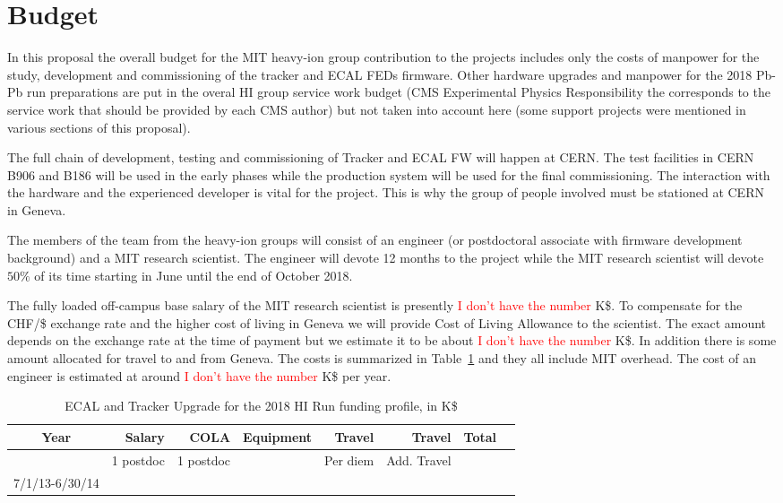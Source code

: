 \section{Budget}
\label{sec:funding}

In this proposal the overall budget for the MIT heavy-ion group contribution to the projects includes only the costs of manpower for the study, development and commissioning of the tracker and ECAL FEDs firmware. Other hardware upgrades and manpower for the 2018 Pb-Pb run preparations are put in the overal HI group service work budget (CMS Experimental Physics Responsibility the corresponds to the service work that should be provided by each CMS author)  but not taken into account here (some support projects were mentioned in various sections of this proposal).

The full chain of development, testing and commissioning of Tracker and ECAL FW will happen at CERN. The test facilities in CERN B906 and B186 will be used in the early phases while the production system will be used for the final commissioning. The interaction with the hardware and the experienced developer is vital for the project. This is why the group of people involved must be stationed at CERN in Geneva.

The members of the team from the heavy-ion groups will consist of an engineer (or postdoctoral associate with firmware development background)  and a MIT research scientist. The engineer will devote 12 months to the project while the MIT research scientist will devote $50\%$ of its time starting in June until the end of October 2018. 
 

The fully loaded off-campus base salary of the MIT research scientist is presently \textcolor{red}{I don't have the number} K\$. To compensate for the CHF/\$ exchange rate and the higher cost of living in Geneva we will provide Cost of Living Allowance to the scientist. The exact amount depends on the exchange rate at the time of payment but we estimate it to be about \textcolor{red}{I don't have the number} K\$. In addition there is some amount allocated for travel to and from Geneva. The costs is summarized in Table~\ref{OpCost} and they all include MIT overhead. The cost of an engineer is estimated at around \textcolor{red}{I don't have the number} K\$ per year.

\begin{table}[hbt]
\begin{center}
\begin{tabular}{|c|r|r|r|r|r|r|r|}
\hline
Year        & Salary & COLA & Equipment & Travel & Travel& Total \\ \hline
            &  1 postdoc   & 1 postdoc   &  & Per diem       &  Add. Travel     &     \\ \hline
7/1/13-6/30/14  &     &    &       &   &      &    \\ \hline
\end{tabular}
\end{center}
\caption{ECAL and Tracker Upgrade for the 2018 HI Run funding profile, in K\$}
\label{OpCost}
\end{table}
